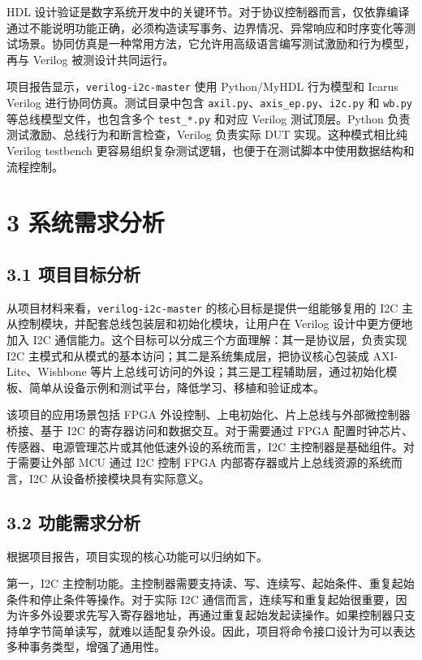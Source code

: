 HDL 设计验证是数字系统开发中的关键环节。对于协议控制器而言，仅依靠编译通过不能说明功能正确，必须构造读写事务、边界情况、异常响应和时序变化等测试场景。协同仿真是一种常用方法，它允许用高级语言编写测试激励和行为模型，再与 Verilog 被测设计共同运行。

项目报告显示，\texttt{verilog-i2c-master} 使用 Python/MyHDL 行为模型和 Icarus Verilog 进行协同仿真。测试目录中包含 \texttt{axil.py}、\texttt{axis\_ep.py}、\texttt{i2c.py} 和 \texttt{wb.py} 等总线模型文件，也包含多个 \texttt{test\_*.py} 和对应 Verilog 测试顶层。Python 负责测试激励、总线行为和断言检查，Verilog 负责实际 DUT 实现。这种模式相比纯 Verilog testbench 更容易组织复杂测试逻辑，也便于在测试脚本中使用数据结构和流程控制。

\section{3 系统需求分析}\label{ux7cfbux7edfux9700ux6c42ux5206ux6790}

\subsection{3.1 项目目标分析}\label{ux9879ux76eeux76eeux6807ux5206ux6790}

从项目材料来看，\texttt{verilog-i2c-master} 的核心目标是提供一组能够复用的 I2C 主从控制模块，并配套总线包装层和初始化模块，让用户在 Verilog 设计中更方便地加入 I2C 通信能力。这个目标可以分成三个方面理解：其一是协议层，负责实现 I2C 主模式和从模式的基本访问；其二是系统集成层，把协议核心包装成 AXI-Lite、Wishbone 等片上总线可访问的外设；其三是工程辅助层，通过初始化模板、简单从设备示例和测试平台，降低学习、移植和验证成本。

该项目的应用场景包括 FPGA 外设控制、上电初始化、片上总线与外部微控制器桥接、基于 I2C 的寄存器访问和数据交互。对于需要通过 FPGA 配置时钟芯片、传感器、电源管理芯片或其他低速外设的系统而言，I2C 主控制器是基础组件。对于需要让外部 MCU 通过 I2C 控制 FPGA 内部寄存器或片上总线资源的系统而言，I2C 从设备桥接模块具有实际意义。

\subsection{3.2 功能需求分析}\label{ux529fux80fdux9700ux6c42ux5206ux6790}

根据项目报告，项目实现的核心功能可以归纳如下。

第一，I2C 主控制功能。主控制器需要支持读、写、连续写、起始条件、重复起始条件和停止条件等操作。对于实际 I2C 通信而言，连续写和重复起始很重要，因为许多外设要求先写入寄存器地址，再通过重复起始发起读操作。如果控制器只支持单字节简单读写，就难以适配复杂外设。因此，项目将命令接口设计为可以表达多种事务类型，增强了通用性。

